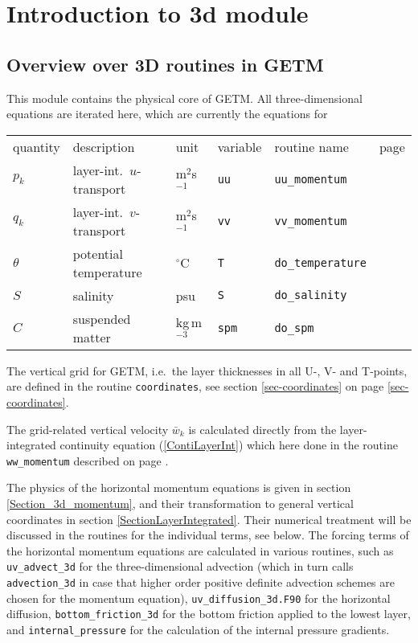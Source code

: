 \section{Introduction to 3d module}

\subsection{Overview over 3D routines in GETM}
\label{Section_Overview_3D}


This module contains the physical core of GETM. All three-dimensional
equations are iterated here, which are currently the equations for

\vspace{0.5cm}

\begin{tabular}{llllll}
quantity & description & unit & variable & routine name & page \\
$p_k$    & layer-int.\ $u$-transport & m$^2$s$^{-1}$ & {\tt uu} & 
{\tt uu\_momentum} & \pageref{sec-uu-momentum-3d} \\
$q_k$    & layer-int.\ $v$-transport & m$^2$s$^{-1}$ & {\tt vv} & 
{\tt vv\_momentum} & \pageref{sec-vv-momentum-3d} \\
$\theta$    & potential temperature & $^{\circ}$C & {\tt T} & 
{\tt do\_temperature} & \pageref{sec-do-temperature} \\
$S$    & salinity & psu & {\tt S} & 
{\tt do\_salinity} & \pageref{sec-do-salinity} \\
$C$    & suspended matter & kg\,m$^{-3}$ & {\tt spm} & 
{\tt do\_spm} & \pageref{sec-do-spm} \\
\end{tabular}

\vspace{0.5cm}

The vertical grid for GETM, i.e.\ the layer thicknesses in all
U-, V- and T-points, are defined in the routine {\tt coordinates},
see section \ref{sec-coordinates} on page \ref{sec-coordinates}.

The grid-related vertical velocity $\bar w_k$ is calculated directly from 
the layer-integrated continuity equation (\ref{ContiLayerInt}) which here done
in the routine {\tt ww\_momentum} described on page \pageref{sec-ww-momentum-3d}.

The physics of the horizontal momentum equations is given in
section \ref{Section_3d_momentum}, and their transformation to general vertical
coordinates in section \ref{SectionLayerIntegrated}. Their numerical
treatment will be discussed in the routines for the individual terms, see
below.
The forcing terms of the horizontal momentum equations are calculated in 
various routines, such as {\tt uv\_advect\_3d} for the three-dimensional 
advection (which in turn calls 
{\tt advection\_3d} in case that higher order positive definite advection
schemes are chosen for the momentum equation), 
{\tt uv\_diffusion\_3d.F90} for the horizontal diffusion, 
{\tt bottom\_friction\_3d} for the bottom friction applied to the lowest
layer, and {\tt internal\_pressure} for the calculation of the internal
pressure gradients. 

